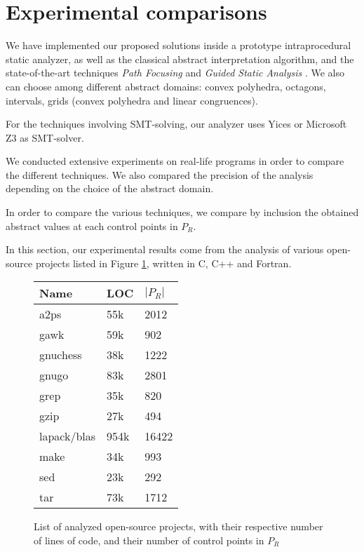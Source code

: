 \documentclass[preprint]{sigplanconf}
\begin{document}
\section{Experimental comparisons}
\label{sec:experiments}

We have implemented our proposed solutions inside a prototype intraprocedural
static analyzer,
as well as the classical abstract interpretation algorithm, and the state-of-the-art
techniques \emph{Path Focusing} \cite{Monniaux_Gonnord_SAS11} and \emph{Guided
Static Analysis} \cite{DBLP:conf/sas/GopanR07}.
We also can choose among different abstract domains: convex polyhedra, octagons,
intervals, grids (convex polyhedra and linear congruences).

For the techniques involving SMT-solving, our analyzer uses Yices
\cite{DBLP:conf/cav/DutertreM06} or Microsoft Z3\cite{DBLP:conf/tacas/MouraB08}
as SMT-solver.

We conducted extensive experiments on real-life programs in order to compare the
different techniques. We also compared the precision of the analysis depending
on the choice of the abstract domain.

In order to compare the various techniques, we compare by inclusion the obtained
abstract values at each control points in $P_R$.


In this section, our experimental results come from the analysis of various
open-source projects listed in Figure \ref{fig:projects}, written in C, C++ and
Fortran.
\begin{figure}[!h]
	\centering
\begin{tabular}{|l|l|l|} \hline
	Name & LOC & $|P_R|$ \\ \hline
	a2ps & 55k & 2012\\
	gawk & 59k & 902\\ 
	gnuchess & 38k & 1222\\ 
	gnugo & 83k & 2801\\
	grep & 35k & 820\\
	gzip & 27k & 494\\
	lapack/blas & 954k & 16422\\
	make & 34k & 993\\ 
	sed & 23k & 292\\
	tar & 73k & 1712\\
	\hline
\end{tabular}
\caption{List of analyzed open-source projects, with their respective number of
lines of code, and their number of control points in $P_R$}
\label{fig:projects}
\end{figure}
\end{document}
